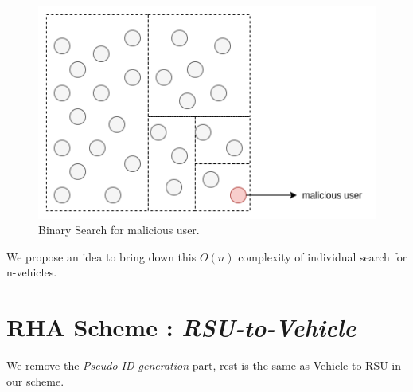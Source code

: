 \documentclass[10pt,journal,letterpaper]{IEEEtran}
\begin{document}
\begin{figure}[h]
    \centering
    \captionsetup{justification=centering}
    \includegraphics[scale=0.4]{binary_grey.png}
    \caption{Binary Search for malicious user.}
    \label{fig:binary_Search}
\end{figure}

We propose an idea to bring down this $O(n)$ complexity of individual search for n-vehicles.\\
%
%

\section{RHA Scheme : \emph{RSU-to-Vehicle}}
We remove the \emph{Pseudo-ID generation} part, rest is the same as
Vehicle-to-RSU in our scheme.
\end{document}
